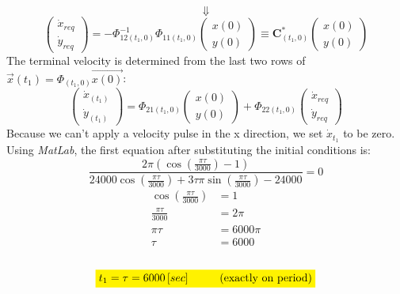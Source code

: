 \documentclass[11pt, a4paper]{article}
\begin{document}
\begin{equation*}
    \Downarrow
\end{equation*}
\begin{equation}
    \begin{pmatrix}
        \dot{x}_{req} \\
        \dot{y}_{req}
    \end{pmatrix} = -\Phi_{12(t_1,0)}^{-1}\Phi_{11(t_1,0)}\begin{pmatrix}
        x(0)\\y(0)
    \end{pmatrix} \equiv \mathbf{C}^*_{(t_1,0)} \begin{pmatrix}
        x(0)\\y(0)
    \end{pmatrix}
\end{equation}
The terminal velocity is determined from the last two rows of $\vec{x}(t_1)=\Phi_(t_1,0)\vec{x(0)}$:
\begin{equation}
    \begin{pmatrix}
        \dot{x}_{(t_1)}\\\dot{y}_{(t_1)}
    \end{pmatrix} = \Phi_{21(t_1,0)}\begin{pmatrix}
        x(0)\\y(0)
    \end{pmatrix} + \Phi_{22(t_1,0)}\begin{pmatrix}
        \dot{x}_{req} \\
        \dot{y}_{req}
    \end{pmatrix}
\end{equation}
Because we can't apply a velocity pulse in the x direction, we set $\dot{x}_{t_1}$ to be zero. Using \emph{MatLab}, the first equation after substituting the initial conditions is:
\begin{equation}
    \frac{\displaystyle2\pi\left(\cos\left(\frac{\pi\tau}{3000}\right)-1\right)}{\displaystyle24000\cos\left(\frac{\pi\tau}{3000}\right)+3\tau\pi\sin\left(\frac{\pi\tau}{3000}\right)-24000} = 0
\end{equation}
\begin{align}
    \cos\left(\frac{\pi\tau}{3000}\right) &= 1 \\
    \frac{\pi\tau}{3000} &= 2\pi \\
    \pi\tau &= 6000\pi \\
    \tau &= 6000
\end{align}
\\
$$\colorbox{yellow}{$t_1 = \tau = 6000\left[sec\right]$\hspace{1cm}(exactly on period)}$$
\end{document}
